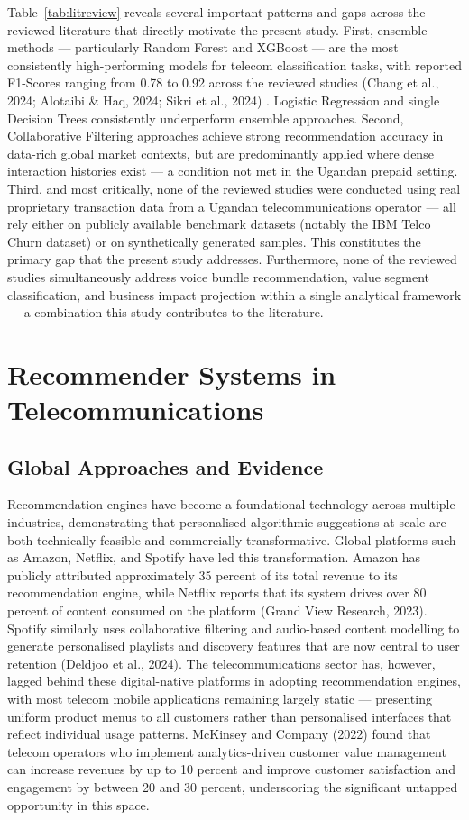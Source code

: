 Table~\ref{tab:litreview} reveals several important patterns and gaps across the reviewed literature that directly motivate the present study. First, ensemble
methods --- particularly Random Forest and XGBoost --- are the most consistently high-performing models for telecom classification tasks, with reported F1-Scores
ranging from 0.78 to 0.92 across the reviewed studies  (Chang et al., 2024; Alotaibi \& Haq, 2024; Sikri et al., 2024) \cite{ref11, ref8, ref43}.
Logistic Regression and single Decision Trees consistently underperform ensemble approaches. Second, Collaborative Filtering approaches achieve strong recommendation
accuracy in data-rich global market contexts, but are predominantly applied where dense interaction histories exist --- a condition not met in the Ugandan prepaid
setting. Third, and most critically, none of the reviewed studies were conducted using real proprietary transaction data from a Ugandan telecommunications operator
--- all rely either on publicly available benchmark datasets (notably the IBM Telco Churn dataset) or on synthetically generated samples. This constitutes the primary
gap that the present study addresses. Furthermore, none of the reviewed studies simultaneously address voice bundle recommendation, value segment classification, and business impact projection within a single analytical framework --- a combination this study contributes to the literature.

\section{Recommender Systems in Telecommunications}


\subsection{Global Approaches and Evidence}

Recommendation engines have become a foundational technology across multiple industries, demonstrating that personalised algorithmic suggestions at scale are both technically feasible and commercially transformative. Global platforms such as Amazon, Netflix, and Spotify have led this transformation. Amazon has publicly attributed approximately 35 percent of its total revenue to its recommendation engine, while Netflix reports that its system drives over 80 percent of content consumed on the platform (Grand View Research, 2023). Spotify similarly uses collaborative filtering and audio-based content modelling to generate personalised playlists and discovery features that are now central to user retention (Deldjoo et al., 2024). The telecommunications sector has, however, lagged behind these digital-native platforms in adopting recommendation engines, with most telecom mobile applications remaining largely static --- presenting uniform product menus to all customers rather than personalised interfaces that reflect individual usage patterns. McKinsey and Company (2022) found that telecom operators who implement analytics-driven customer value management can increase revenues by up to 10 percent and improve customer satisfaction and engagement by between 20 and 30 percent, underscoring the significant untapped opportunity in this space.

